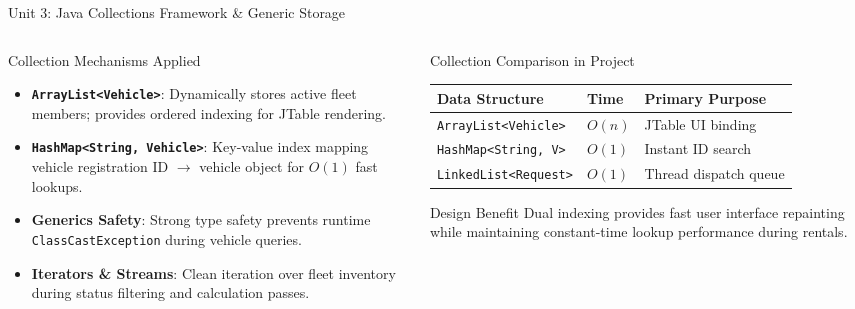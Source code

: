 \documentclass[aspectratio=169,10pt]{beamer}
\begin{document}
\begin{frame}{Unit 3: Java Collections Framework \& Generic Storage}
    \begin{columns}[T]
        \begin{column}{0.48\textwidth}
            \begin{block}{Collection Mechanisms Applied}
                \small
                \begin{itemize}
                    \item \textbf{\texttt{ArrayList<Vehicle>}}: Dynamically stores active fleet members; provides ordered indexing for JTable rendering.
                    \item \textbf{\texttt{HashMap<String, Vehicle>}}: Key-value index mapping vehicle registration ID $\rightarrow$ vehicle object for $O(1)$ fast lookups.
                    \item \textbf{Generics Safety}: Strong type safety prevents runtime \texttt{ClassCastException} during vehicle queries.
                    \item \textbf{Iterators \& Streams}: Clean iteration over fleet inventory during status filtering and calculation passes.
                \end{itemize}
            \end{block}
        \end{column}
        
        \begin{column}{0.48\textwidth}
            \begin{exampleblock}{Collection Comparison in Project}
                \small
                \begin{tabular}{lll}
                    \toprule
                    \textbf{Data Structure} & \textbf{Time} & \textbf{Primary Purpose} \\
                    \midrule
                    \texttt{ArrayList<Vehicle>} & $O(n)$ & JTable UI binding \\
                    \texttt{HashMap<String, V>} & $O(1)$ & Instant ID search \\
                    \texttt{LinkedList<Request>} & $O(1)$ & Thread dispatch queue \\
                    \bottomrule
                \end{tabular}
            \end{exampleblock}
            \vspace{0.3cm}
            \begin{alertblock}{Design Benefit}
                \small
                Dual indexing provides fast user interface repainting while maintaining constant-time lookup performance during rentals.
            \end{alertblock}
        \end{column}
    \end{columns}
\end{frame}
\end{document}
